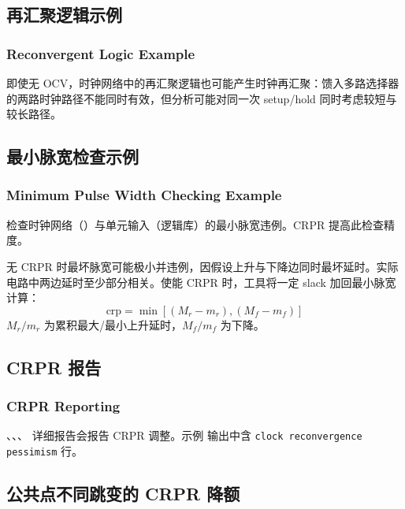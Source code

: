 \subsection{再汇聚逻辑示例}
\subsubsection*{Reconvergent Logic Example}


即使无 OCV，时钟网络中的再汇聚逻辑也可能产生时钟再汇聚：馈入多路选择器的两路时钟路径不能同时有效，但分析可能对同一次 setup/hold 同时考虑较短与较长路径。

\subsection{最小脉宽检查示例}
\subsubsection*{Minimum Pulse Width Checking Example}

 检查时钟网络（）与单元输入（逻辑库）的最小脉宽违例。CRPR 提高此检查精度。


无 CRPR 时最坏脉宽可能极小并违例，因假设上升与下降边同时最坏延时。实际电路中两边延时至少部分相关。使能 CRPR 时，工具将一定 slack 加回最小脉宽计算：
\[
\text{crp} = \min[(M_r - m_r), (M_f - m_f)]
\]
$M_r/m_r$ 为累积最大/最小上升延时，$M_f/m_f$ 为下降。

\subsection{CRPR 报告}
\subsubsection*{CRPR Reporting}

、、、 详细报告会报告 CRPR 调整。示例  输出中含 \texttt{clock reconvergence pessimism} 行。

\subsection{公共点不同跳变的 CRPR 降额}
